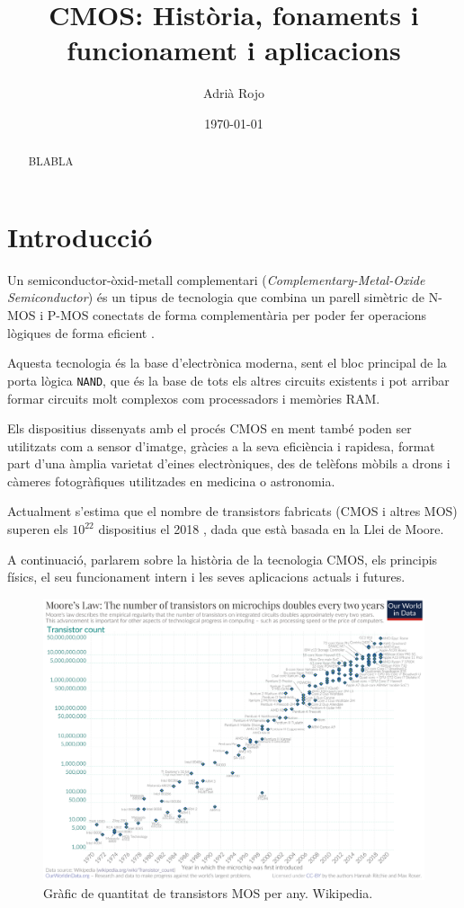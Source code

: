 \documentclass[11pt,a4paper]{article}
\title{\textbf{CMOS: Història, fonaments i funcionament i aplicacions}}
\author{Adrià Rojo}
\date{\today}
\begin{document}
\maketitle
\thispagestyle{fancy}
\begin{abstract}
    BLABLA
\end{abstract}

\section{Introducció}

Un semiconductor-òxid-metall complementari (\textit{Complementary-Metal-Oxide Semiconductor}) és un tipus de tecnologia que combina un parell simètric de N-MOS i P-MOS conectats de forma complementària per poder fer operacions lògiques de forma eficient \autocite{wiki:CMOS}. 

Aquesta tecnologia és la base d'electrònica moderna, sent el bloc principal de la porta lògica \texttt{NAND}, que és la base de tots els altres circuits existents i pot arribar formar circuits molt complexos com processadors i memòries RAM.

Els dispositius dissenyats amb el procés CMOS en ment també poden ser utilitzats com a sensor d'imatge, gràcies a la seva eficiència i rapidesa, format part d'una àmplia varietat d'eines electròniques, des de telèfons mòbils a drons i càmeres fotogràfiques utilitzades en medicina o astronomia. 

Actualment s'estima que el nombre de transistors fabricats (CMOS i altres MOS) superen els $10^{22}$ dispositius el 2018 \autocite{wiki:Transistor_count}, dada que està basada en la Llei de Moore.

A continuació, parlarem sobre la història de la tecnologia CMOS, els principis físics, el seu funcionament intern i les seves aplicacions actuals i futures.

\begin{figure}[h]
    \centering
    \includegraphics[width=0.6\linewidth]{Moore's_Law_Transistor_Count_1970-2020.png}
    \caption{Gràfic de quantitat de transistors MOS per any. Wikipedia.}
    \label{<label>}
\end{figure}
\end{document}
